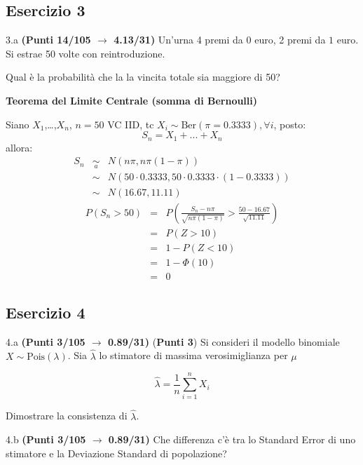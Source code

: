 \documentclass[
  11pt,
]{book}
\theoremstyle{mytheoremstyle}
\theoremstyle{mydefstyle}
\newenvironment{sol}
  {
  \begin{tcolorbox}[enhanced,breakable,arc=0.1mm,boxrule=1pt,colback=white,colframe=iblue,
  title=\bf \fontfamily{lmss}\selectfont \hspace{.5 cm} Soluzione,drop fuzzy shadow]

}{
\end{tcolorbox}
  }
\begin{document}
\subsection{Esercizio 3}\label{esercizio-3-35}

3.a \textbf{(Punti 14/105 \(\rightarrow\) 4.13/31)} Un'urna 4 premi da \(\mbox{0}\) euro, 2 premi da \(\mbox{1}\) euro.
Si estrae 50 volte con reintroduzione.

Qual è la probabilità che la la vincita totale sia maggiore di 50?

\begin{sol}
\textbf{Teorema del Limite Centrale (somma di Bernoulli)}

Siano \(X_1\),\ldots,\(X_n\), \(n=50\) VC IID, tc \(X_i\sim\text{Ber}(\pi=0.3333)\)\(,\forall i\), posto:
\[
      S_n = X_1 + ... + X_n
      \]
allora:\begin{eqnarray*}
  S_n & \mathop{\sim}\limits_{a}& N(n\pi,n\pi(1-\pi)) \\
      &\sim & N(50\cdot0.3333,50\cdot0.3333\cdot(1-0.3333)) \\
      &\sim & N(16.67,11.11)
  \end{eqnarray*}\begin{eqnarray*}
      P( S_n   >   50 ) 
        &=& P\left(  \frac { S_n  -  n\pi }{ \sqrt{n\pi(1-\pi)} }  >  \frac { 50  -  16.67 }{\sqrt{ 11.11 }} \right)  \\
                 &=& P\left(  Z   >   10 \right) \\    &=& 1-P(Z< 10 )\\ 
                 &=&  1-\Phi( 10 ) \\ &=&  0 
      \end{eqnarray*}

\end{sol}

\subsection{Esercizio 4}\label{esercizio-4-35}

4.a \textbf{(Punti 3/105 \(\rightarrow\) 0.89/31)} (\textbf{Punti 3}) Si consideri il modello binomiale \(X\sim\text{Pois}(\lambda)\). Sia \(\hat\lambda\) lo stimatore di massima verosimiglianza per \(\mu\)

\[
  \hat\lambda = \frac 1n \sum_{i=1}^n X_i
\]

Dimostrare la consistenza di \(\hat\lambda\).

4.b \textbf{(Punti 3/105 \(\rightarrow\) 0.89/31)} Che differenza c'è tra lo Standard Error di uno stimatore e la Deviazione Standard di popolazione?
\end{document}
